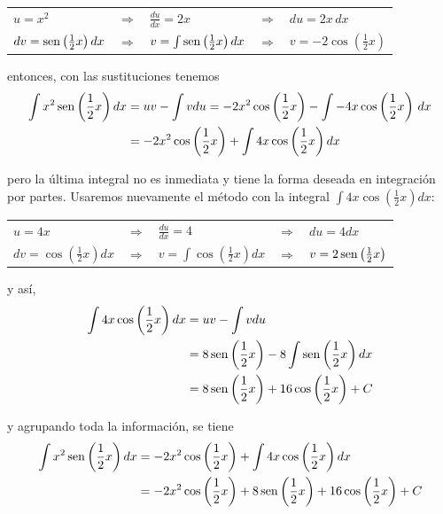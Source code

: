 \begin{parrafonumerado}
\begin{center}
\begin{tabular}{lllll}
  $u=x^{2}$ & $\Rightarrow$ & $\frac{du}{dx} =2x$ & $\Rightarrow$ & $du=2x\,dx$\\
  $dv=\operatorname{sen} \left(\frac{1}{2}x\right)dx$ & $\Rightarrow$ & $v =\int \operatorname{sen} \left(\frac{1}{2}x\right)dx$ & $\Rightarrow$ & $v=-2\cos\left(\frac{1}{2}x\right)$
\end{tabular}
\end{center}

\medskip

entonces, con las sustituciones tenemos
\begin{gather*}
\begin{aligned}
  \displaystyle{\int x^{2}\operatorname{sen}\left(\frac{1}{2}x\right)dx}&=uv-\int vdu=-2x^{2}\cos\left(\frac{1}{2}x\right)-\int -4x\cos \left(\frac{1}{2}x\right)\,dx\\
  &= -2x^{2}\cos \left(\frac{1}{2}x\right)+\int 4x\cos \left(\frac{1}{2}x\right)dx
\end{aligned}
\end{gather*}

pero la última integral no es inmediata y tiene la forma deseada en integración por partes. Usaremos nuevamente el método con la integral $\int 4x\cos \left(\frac{1}{2}x\right)dx$:

\smallskip

\begin{center}
\begin{tabular}{lllll}
  $u=4x$ & $\Rightarrow$ & $\frac{du}{dx} =4$ & $\Rightarrow$ & $du=4dx$\\
  $dv=\cos \left(\frac{1}{2}x\right)dx$ & $\Rightarrow$ & $v =\int \cos \left(\frac{1}{2}x\right)dx$ & $\Rightarrow$ & $v=2\operatorname{sen}\left(\frac{1}{2}x\right)$
\end{tabular}
\end{center}

\medskip

y así,
\begin{align*}
\int 4x\cos \left(\frac{1}{2}x\right)dx&=uv-\int vdu\\
&=8\operatorname{sen}\left(\frac{1}{2}x\right)-8\int \operatorname{sen}\left(\frac{1}{2}x\right)dx\\
&=8\operatorname{sen}\left(\frac{1}{2}x\right)+16 \cos\left(\frac{1}{2}x\right)+C
\end{align*}

y agrupando toda la información, se tiene
\begin{gather*}
\begin{aligned}
  \int x^{2}\operatorname{sen} \left(\frac{1}{2}x\right)dx&=-2x^{2}\cos \left(\frac{1}{2}x\right)+\int 4x\cos \left(\frac{1}{2}x\right)dx\\
  &=-2x^{2}\cos \left(\frac{1}{2}x\right)+8\operatorname{sen} \left(\frac{1}{2}x\right)+16\cos \left(\frac{1}{2}x\right)+C
\end{aligned}
\end{gather*}


\end{parrafonumerado}
